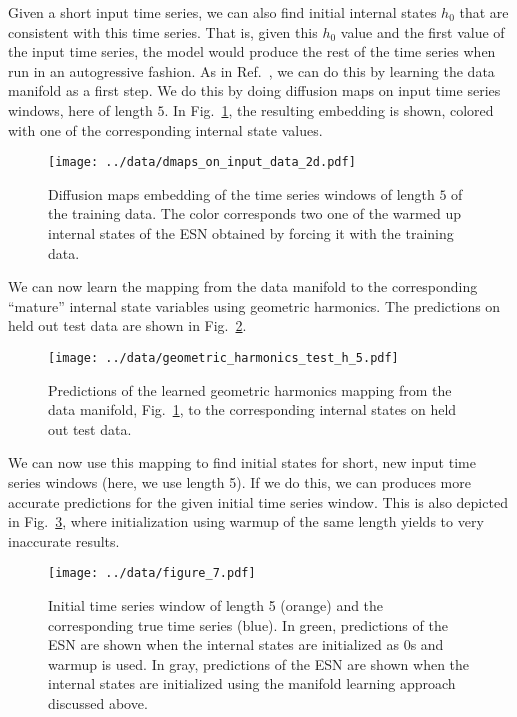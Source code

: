 \documentclass{article}
\begin{document}
Given a short input time series, we can also find initial internal states $h_0$ that are consistent with this time series.
That is, given this $h_0$ value and the first value of the input time series, the model would produce the rest of the time series when run in an autogressive fashion.
As in Ref.~\cite{kemeth2021initializing}, we can do this by learning the data manifold as a first step.
We do this by doing diffusion maps on input time series windows, here of length $5$.
In Fig.~\ref{fig:data_manifold}, the resulting embedding is shown, colored with one of the corresponding internal state values.

\begin{figure}[ht]
  \centering
  \texttt{[image: ../data/dmaps\_on\_input\_data\_2d.pdf]}
  \caption{Diffusion maps embedding of the time series windows of length $5$ of the training data.
    The color corresponds two one of the warmed up internal states of the ESN obtained by forcing it with the training data.}
  \label{fig:data_manifold}
\end{figure}

We can now learn the mapping from the data manifold to the corresponding ``mature'' internal state variables using geometric harmonics.
The predictions on held out test data are shown in Fig.~\ref{fig:gh_predictions}.

\begin{figure}[ht]
  \centering
  \texttt{[image: ../data/geometric\_harmonics\_test\_h\_5.pdf]}
  \caption{Predictions of the learned geometric harmonics mapping from the data manifold, Fig.~\ref{fig:data_manifold},
    to the corresponding internal states on held out test data.}
  \label{fig:gh_predictions}
\end{figure}

We can now use this mapping to find initial states for short, new input time series windows (here, we use length 5).
If we do this, we can produces more accurate predictions for the given initial time series window.
This is also depicted in Fig.~\ref{fig:predictions_new}, where initialization using warmup of the same length yields to very inaccurate results.

\begin{figure}[ht]
  \centering
  \texttt{[image: ../data/figure\_7.pdf]}
  \caption{Initial time series window of length 5 (orange) and the corresponding true time series (blue). In green, predictions of the ESN are shown when the internal states are initialized as 0s and warmup is used.
  In gray, predictions of the ESN are shown when the internal states are initialized using the manifold learning approach discussed above.}
  \label{fig:predictions_new}
\end{figure}





\end{document}
